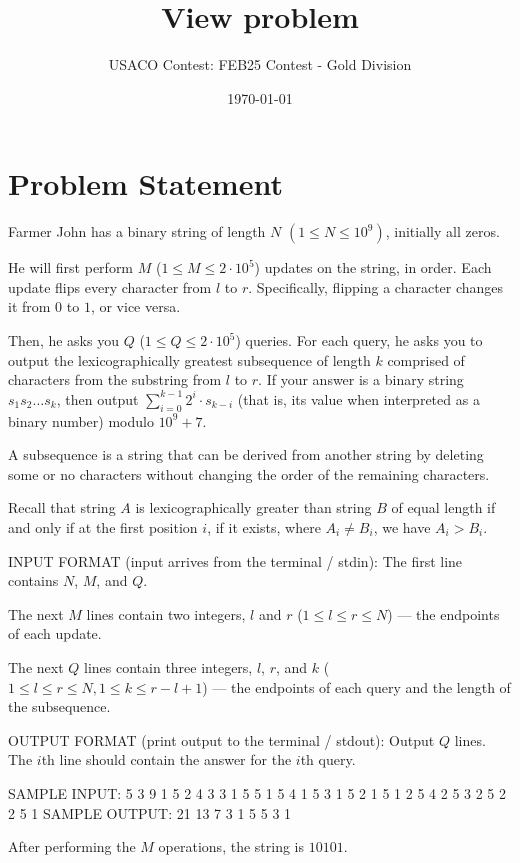 \documentclass[12pt]{article}
\title{View problem}
\author{USACO Contest: FEB25 Contest - Gold Division}
\date{\today}
\begin{document}
\maketitle

\section*{Problem Statement}


Farmer John has a binary string of length $N$ $(1 \leq N \leq 10^9)$, initially
all zeros.

He will first perform $M$ ($1 \leq M \leq 2 \cdot 10^5$) updates on the string,
in order.  Each update flips every character from $l$ to $r$. Specifically,
flipping a character changes it from $0$ to $1$, or vice versa.

Then, he asks you $Q$ ($1 \leq Q \leq 2 \cdot 10^5$) queries. For each query, he
asks you to output the lexicographically greatest subsequence of length $k$
comprised of characters from the substring from $l$ to $r$. If your answer is a
binary string $s_1s_2 \dots s_k$, then output
$\sum_{i=0}^{k-1} 2^i \cdot s_{k-i}$ (that is, its value when interpreted as a
binary number) modulo $10^9+7$.

A subsequence is a string that can be derived from another string by deleting
some or no characters without changing the order of the remaining characters.


Recall that string $A$ is lexicographically greater than string $B$ of equal
length if and only if at the first position $i$, if it exists, where
$A_i \neq B_i$, we have $A_i > B_i$.

INPUT FORMAT (input arrives from the terminal / stdin):
The first line contains $N$, $M$, and $Q$.

The next $M$ lines contain two integers, $l$ and $r$ ($1 \leq l \leq r \leq N$)
— the endpoints of each update.

The next $Q$ lines contain three integers, $l$, $r$, and $k$
($1 \leq l \leq r \leq N, 1 \leq k \leq r - l + 1$) — the endpoints of each
query and the length of the subsequence.


OUTPUT FORMAT (print output to the terminal / stdout):
Output $Q$ lines. The $i$th line should contain the answer for the $i$th query. 


SAMPLE INPUT:
5 3 9
1 5
2 4
3 3
1 5 5
1 5 4
1 5 3
1 5 2
1 5 1
2 5 4
2 5 3
2 5 2
2 5 1
SAMPLE OUTPUT: 
21
13
7
3
1
5
5
3
1

After performing the $M$ operations, the string is $10101$.
\end{document}

